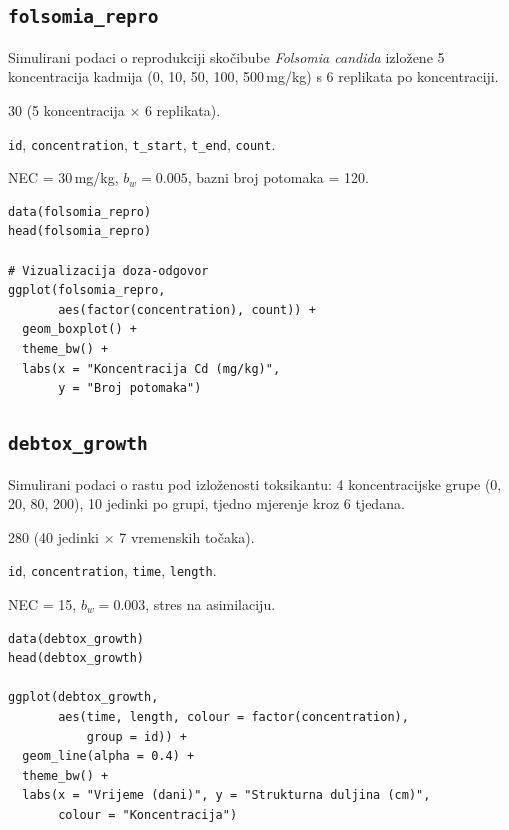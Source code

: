\documentclass[11pt,a4paper]{article}
\newcommand{\code}[1]{\texttt{#1}}
\begin{document}
\subsection{\code{folsomia\_repro}}

Simulirani podaci o reprodukciji skočibube \textit{Folsomia candida}
izložene 5 koncentracija kadmija (0, 10, 50, 100, 500\,mg/kg) s
6 replikata po koncentraciji.

\begin{description}[nosep,leftmargin=3cm]
  \item[Redaka] 30 (5 koncentracija $\times$ 6 replikata).
  \item[Stupci] \code{id}, \code{concentration}, \code{t\_start}, \code{t\_end},
    \code{count}.
  \item[Stvarni parametri] NEC = 30\,mg/kg, $b_w = 0.005$, bazni broj potomaka = 120.
\end{description}

\begin{lstlisting}
data(folsomia_repro)
head(folsomia_repro)

# Vizualizacija doza-odgovor
ggplot(folsomia_repro,
       aes(factor(concentration), count)) +
  geom_boxplot() +
  theme_bw() +
  labs(x = "Koncentracija Cd (mg/kg)",
       y = "Broj potomaka")
\end{lstlisting}


\subsection{\code{debtox\_growth}}

Simulirani podaci o rastu pod izloženosti toksikantu: 4 koncentracijske
grupe (0, 20, 80, 200), 10 jedinki po grupi, tjedno mjerenje kroz
6 tjedana.

\begin{description}[nosep,leftmargin=3cm]
  \item[Redaka] 280 (40 jedinki $\times$ 7 vremenskih točaka).
  \item[Stupci] \code{id}, \code{concentration}, \code{time}, \code{length}.
  \item[Stvarni parametri] NEC = 15, $b_w = 0.003$, stres na asimilaciju.
\end{description}

\begin{lstlisting}
data(debtox_growth)
head(debtox_growth)

ggplot(debtox_growth,
       aes(time, length, colour = factor(concentration),
           group = id)) +
  geom_line(alpha = 0.4) +
  theme_bw() +
  labs(x = "Vrijeme (dani)", y = "Strukturna duljina (cm)",
       colour = "Koncentracija")
\end{lstlisting}
\end{document}

